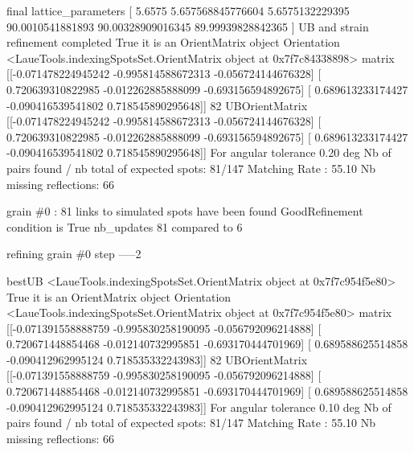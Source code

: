 \documentclass[letterpaper,10pt,english]{sphinxmanual}
\begin{document}
\begin{sphinxalltt}
final lattice\_parameters {[} 5.6575             5.657568845776604  5.6575132229395
 90.0010541881893   90.00328909016345  89.99939828842365 {]}
UB and strain refinement completed
True it is an OrientMatrix object
Orientation \textless{}LaueTools.indexingSpotsSet.OrientMatrix object at 0x7f7c84338898\textgreater{}
matrix {[}{[}-0.071478224945242 -0.995814588672313 -0.056724144676328{]}
 {[} 0.720639310822985 -0.012262885888099 -0.693156594892675{]}
 {[} 0.689613233174427 -0.090416539541802  0.718545890295648{]}{]}
 82
UBOrientMatrix {[}{[}-0.071478224945242 -0.995814588672313 -0.056724144676328{]}
 {[} 0.720639310822985 -0.012262885888099 -0.693156594892675{]}
 {[} 0.689613233174427 -0.090416539541802  0.718545890295648{]}{]}
For angular tolerance 0.20 deg
Nb of pairs found / nb total of expected spots: 81/147
Matching Rate : 55.10
Nb missing reflections: 66

grain \#0 : 81 links to simulated spots have been found
GoodRefinement condition is  True
nb\_updates 81 compared to 6


 refining grain \#0 step -----2

bestUB \textless{}LaueTools.indexingSpotsSet.OrientMatrix object at 0x7f7c954f5e80\textgreater{}
True it is an OrientMatrix object
Orientation \textless{}LaueTools.indexingSpotsSet.OrientMatrix object at 0x7f7c954f5e80\textgreater{}
matrix {[}{[}-0.071391558888759 -0.995830258190095 -0.056792096214888{]}
 {[} 0.720671448854468 -0.012140732995851 -0.693170444701969{]}
 {[} 0.689588625514858 -0.090412962995124  0.718535332243983{]}{]}
 82
UBOrientMatrix {[}{[}-0.071391558888759 -0.995830258190095 -0.056792096214888{]}
 {[} 0.720671448854468 -0.012140732995851 -0.693170444701969{]}
 {[} 0.689588625514858 -0.090412962995124  0.718535332243983{]}{]}
For angular tolerance 0.10 deg
Nb of pairs found / nb total of expected spots: 81/147
Matching Rate : 55.10
Nb missing reflections: 66


\end{sphinxalltt}
\end{document}

